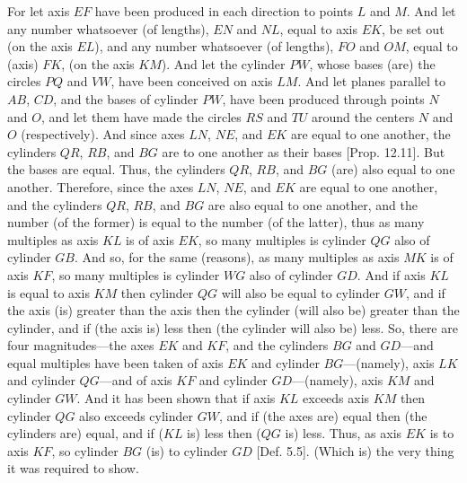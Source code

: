 \begin{Parallel}{}{}
{For let axis $EF$ have been produced in each direction to points $L$ and $M$. And let any number whatsoever (of
lengths), $EN$ and $NL$, equal to axis $EK$, be set out (on the axis $EL$), and any number whatsoever
(of lengths), $FO$ and $OM$, equal to (axis) $FK$, (on the axis $KM$). And let the cylinder $PW$, whose bases
(are) the circles $PQ$ and $VW$, have been
conceived on axis $LM$. And let planes parallel to $AB$, $CD$, and the bases of cylinder $PW$, have been produced
through points $N$ and $O$, and let them have made the circles $RS$ and $TU$ around the centers $N$ and $O$ (respectively).
And since axes $LN$, $NE$, and $EK$ are equal to one another,  the cylinders $QR$, $RB$, and $BG$ are to one another
as their bases [Prop. 12.11]. But the bases are equal. Thus, the cylinders $QR$, $RB$, and $BG$
(are) also equal to one another. Therefore, since the axes $LN$, $NE$, and $EK$ are equal to one another, and the cylinders
$QR$, $RB$, and $BG$ are also equal to one another, and the number (of the former) is equal to the number (of the latter), 
thus as many multiples as axis $KL$ is of axis $EK$, so many multiples is cylinder $QG$ also of cylinder $GB$.
And so, for the same (reasons),  as many multiples as axis $MK$  is of axis $KF$, so many multiples is cylinder $WG$
also of cylinder $GD$.  And if axis $KL$ is equal to axis $KM$ then cylinder $QG$ will also be equal to
cylinder $GW$, and if the axis (is) greater than the axis then the cylinder (will also be) greater than the cylinder, and if (the axis is) less
then (the cylinder will also be) less. So, there are four magnitudes---the axes $EK$ and $KF$, and the cylinders
$BG$ and $GD$---and equal multiples have been taken of axis $EK$ and 
cylinder $BG$---(namely), axis $LK$ and
cylinder $QG$---and of axis $KF$
 and  cylinder $GD$---(namely), axis
$KM$ and  cylinder $GW$. And it has been shown that if axis $KL$ exceeds axis $KM$ then cylinder
$QG$ also exceeds  cylinder $GW$, and if (the axes are) equal then (the cylinders are) equal, and if ($KL$ is) less then ($QG$ is) less.
Thus, as axis $EK$ is to axis $KF$, so cylinder $BG$ (is) to cylinder $GD$ [Def. 5.5]. (Which is)
the very thing it was required to show.}
\end{Parallel}

